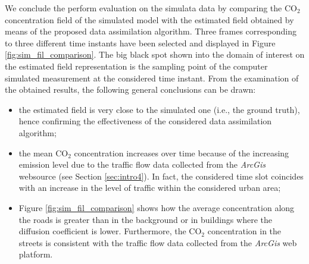 \documentclass[journal]{IEEEtran}
\begin{document}
We conclude the perform evaluation on the simulata data by comparing the CO$_2$ concentration field of the simulated model with the estimated field obtained by means of the proposed
data assimilation algorithm. Three frames corresponding to three different time instants have been selected and displayed in Figure \ref{fig:sim_fil_comparison}. The big black spot shown into the domain of interest on the estimated field representation is the sampling point of the computer simulated measurement at the considered time instant.  From the examination of the obtained results, the following general conclusions can be drawn:
\begin{itemize}
\item the estimated field is very close to the simulated one (i.e., the ground truth), hence confirming the effectiveness of the considered data assimilation algorithm;
\item the mean CO$_2$ concentration increases over time because of the increasing emission level due to the traffic flow data collected from the \textit{ArcGis} websource (see Section \ref{sec:intro4}). 
In fact, the considered time slot  coincides with an increase in the level of traffic within the considered urban area; 
\item Figure \ref{fig:sim_fil_comparison} shows how the average concentration along the roads is greater than in the background or in buildings where the diffusion coefficient is lower. Furthermore, the CO$_2$ concentration in the streets is consistent with the traffic flow data collected from the \textit{ArcGis} web platform.
\end{itemize}
\end{document}
